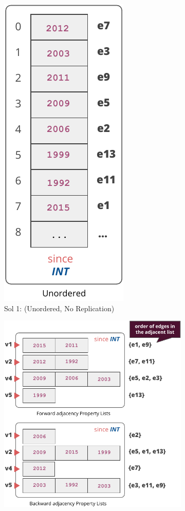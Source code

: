 \begin{figure}
	\hspace*{-20pt}
	\begin{subfigure}{0.45\textwidth}
		\centering
		\includegraphics[scale=0.75]{img/sol1}
		\captionsetup{justification=centering}
		\caption{Sol 1: (Unordered, No Replication)}
		\label{fig:sol1}
	\end{subfigure}
	\begin{subfigure}{0.55\textwidth}
		\centering
		\includegraphics[scale=0.75]{img/sol2}

\end{subfigure}
\end{figure}
